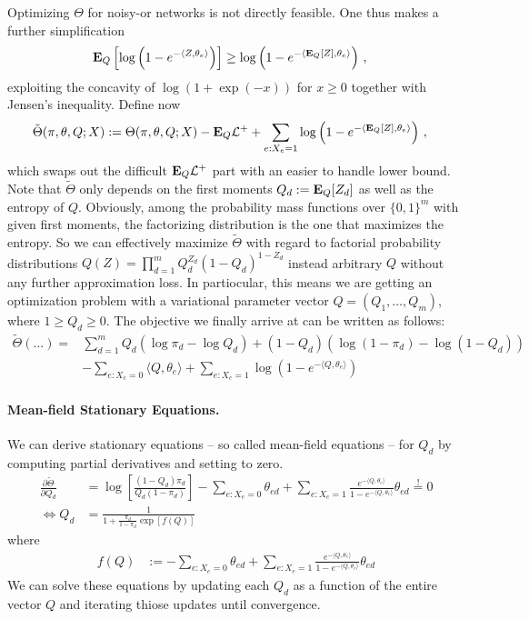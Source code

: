 \documentclass{article}
\newcommand{\E}{{\bf E}}
\newcommand{\loglike}{{\mathcal L}}
\begin{document}
Optimizing $\Theta$ for noisy-or networks is not directly feasible. One thus makes a further simplification
\begin{align}
\E_Q \left[ \log \left( 1- e ^{- \langle Z, \theta_e \rangle} \right) \right] & \ge \log \left(1- e^{- \langle \E_Q[Z], \theta_{e}\rangle} \right)\,, 
\end{align} 
exploiting the concavity of $\log(1+\exp(-x))$ for $x \ge 0$ together with Jensen's inequality.  Define now 
\begin{align}
\tilde\Theta(\pi, \theta, Q; X) :=  & \; \Theta(\pi, \theta, Q; X) - \E_Q \loglike^+
+ \sum_{e: X_e=1} \log \left(1- e^{- \langle \E_Q[Z], \theta_{e} \rangle} \right) \,,
\end{align}
which swaps out the difficult $\E_Q \loglike^+$ part with an easier to handle lower bound. Note that $\tilde \Theta$ only depends on the first moments $Q_d := \E_Q[Z_d]$ as well as the entropy of $Q$. Obviously, among the probability mass functions over $\{0,1\}^m$ with given first moments, the factorizing distribution is the one that maximizes the entropy. So we can effectively maximize $\tilde \Theta$ with regard to factorial probability distributions $Q(Z) = \prod_{d=1}^m Q_d^{Z_d} (1-Q_d)^{1-Z_d}$ instead arbitrary $Q$ without any further approximation loss. In partiocular, this means we are getting an optimization problem with a variational parameter vector $Q = (Q_1,\dots,Q_m)$, where $1 \ge Q_d \ge 0$. The objective we finally arrive at can be written as follows:
\begin{align}
\tilde \Theta (\dots) = & \sum_{d=1}^m Q_d \left(  \log \pi_d - \log Q_d \right)  + (1-Q_d) \left(  \log (1-\pi_d) - \log (1-Q_d)\right) 
\nonumber \\
& - \sum_{e: X_e =0} \langle Q, \theta_e \rangle  + \sum_{e: X_e=1}  \log \left(1- e^{- \langle Q, \theta_{e} \rangle} \right)
\end{align}

\paragraph{Mean-field Stationary Equations.}

We can derive stationary equations -- so called mean-field equations -- for $Q_d$ by computing partial derivatives and setting to zero. 
\begin{align}
\nonumber \frac{\partial \tilde\Theta}{\partial Q_d} & = 
\log \left[ \frac{(1-Q_d)\pi_d}{Q_d (1-\pi_d)}  \right] - \sum_{e: X_e=0} \theta_{ed} + 
\sum_{e: X_e=1} \frac{e^{-\langle Q, \theta_e \rangle}}{1 - e^{-\langle Q, \theta_e \rangle}} \theta_{ed} \stackrel{!}{=}0 \\
\iff  Q_d & =  \frac{1}{1 +  \frac{\pi_d}{1-\pi_d} \exp[f(Q)]}
\end{align}
where 
\begin{align}
f(Q) & := - \sum_{e: X_e=0} \theta_{ed} + 
\sum_{e: X_e=1} \frac{e^{-\langle Q, \theta_e \rangle}}{1 - e^{-\langle Q, \theta_e \rangle}} \theta_{ed} 
\end{align}
We can solve these equations by updating each $Q_d$ as a function of the entire vector $Q$ and iterating thiose updates until convergence.\\[4mm]
\end{document}
